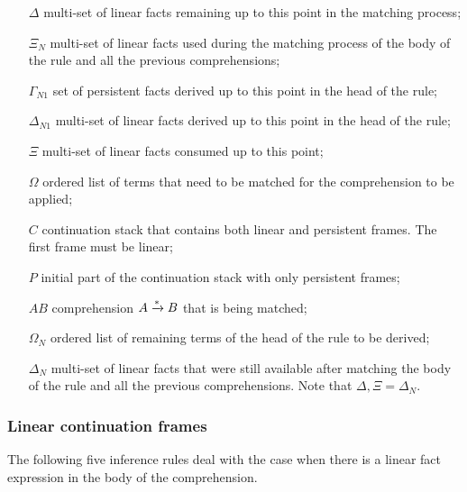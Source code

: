 \begin{enumerate}
   \item[$\Delta$] multi-set of linear facts remaining up to this point in the matching process;
   \item[$\Xi_N$] multi-set of linear facts used during the matching process of the body of the rule and all the previous comprehensions;
   \item[$\Gamma_{N1}$] set of persistent facts derived up to this point in the head of the rule;
   \item[$\Delta_{N1}$] multi-set of linear facts derived up to this point in the head of the rule;
   \item[$\Xi$] multi-set of linear facts consumed up to this point;
   \item[$\Omega$] ordered list of terms that need to be matched for the comprehension to be applied;
   \item[$C$] continuation stack that contains both linear and persistent frames. The first frame must be linear;
   \item[$P$] initial part of the continuation stack with only persistent frames;
   \item[$AB$] comprehension $A \xrightarrow{*} B$ that is being matched;
   \item[$\Omega_N$] ordered list of remaining terms of the head of the rule to be derived;
   \item[$\Delta_N$] multi-set of linear facts that were still available after matching the body of the rule and all the previous comprehensions. Note that $\Delta, \Xi = \Delta_N$.
\end{enumerate}

\subsubsection{Linear continuation frames}

The following five inference rules deal with the case when there is a linear fact expression in the body of the comprehension.

